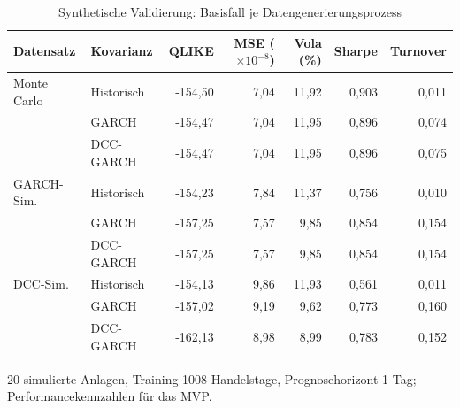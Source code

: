 \begin{table}[htbp]
  \centering
  \footnotesize
  \begin{tabular}{llrrrrr}
    \toprule
    Datensatz & Kovarianz & QLIKE & MSE ($\times 10^{-8}$) & Vola (\%) & Sharpe & Turnover \\
    \midrule
    Monte Carlo & Historisch & -154,50 & 7,04 & 11,92 & 0,903 & 0,011 \\
     & GARCH & -154,47 & 7,04 & 11,95 & 0,896 & 0,074 \\
     & DCC-GARCH & -154,47 & 7,04 & 11,95 & 0,896 & 0,075 \\
    \midrule
    GARCH-Sim. & Historisch & -154,23 & 7,84 & 11,37 & 0,756 & 0,010 \\
     & GARCH & -157,25 & 7,57 & 9,85 & 0,854 & 0,154 \\
     & DCC-GARCH & -157,25 & 7,57 & 9,85 & 0,854 & 0,154 \\
    \midrule
    DCC-Sim. & Historisch & -154,13 & 9,86 & 11,93 & 0,561 & 0,011 \\
     & GARCH & -157,02 & 9,19 & 9,62 & 0,773 & 0,160 \\
     & DCC-GARCH & -162,13 & 8,98 & 8,99 & 0,783 & 0,152 \\
    \bottomrule
  \end{tabular}
  \caption{Synthetische Validierung: Basisfall je Datengenerierungsprozess}
  \label{tab:synth_basis}
  \begin{minipage}{\linewidth}\vspace{0.4em}\centering\footnotesize
  20 simulierte Anlagen, Training 1008 Handelstage, Prognosehorizont 1 Tag; Performancekennzahlen für das MVP.
  \end{minipage}
\end{table}
